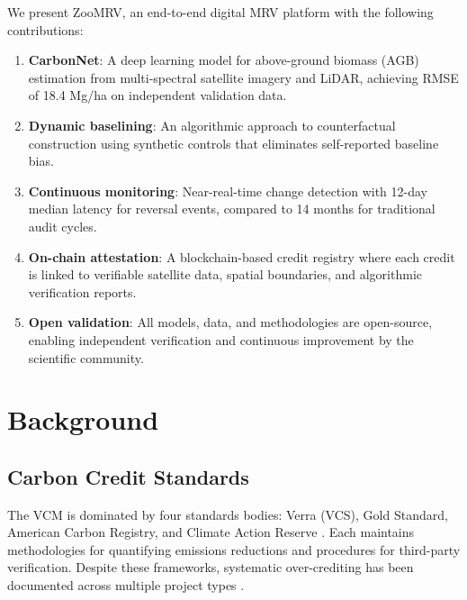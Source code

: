 \documentclass[11pt,a4paper]{article}
\begin{document}
We present ZooMRV, an end-to-end digital MRV platform with the following
contributions:

\begin{enumerate}
  \item \textbf{CarbonNet}: A deep learning model for above-ground
    biomass (AGB) estimation from multi-spectral satellite imagery and
    LiDAR, achieving RMSE of 18.4 Mg/ha on independent validation data.

  \item \textbf{Dynamic baselining}: An algorithmic approach to
    counterfactual construction using synthetic controls
    \citep{abadie2010synthetic} that eliminates self-reported baseline
    bias.

  \item \textbf{Continuous monitoring}: Near-real-time change detection
    with 12-day median latency for reversal events, compared to 14
    months for traditional audit cycles.

  \item \textbf{On-chain attestation}: A blockchain-based credit
    registry where each credit is linked to verifiable satellite data,
    spatial boundaries, and algorithmic verification reports.

  \item \textbf{Open validation}: All models, data, and methodologies
    are open-source, enabling independent verification and continuous
    improvement by the scientific community.
\end{enumerate}


\section{Background}
\label{sec:background}

\subsection{Carbon Credit Standards}

The VCM is dominated by four standards bodies: Verra (VCS), Gold
Standard, American Carbon Registry, and Climate Action Reserve
\citep{schneider2019double}. Each maintains methodologies for
quantifying emissions reductions and procedures for third-party
verification. Despite these frameworks, systematic over-crediting has
been documented across multiple project types \citep{badgley2022,
west2023action}.
\end{document}
